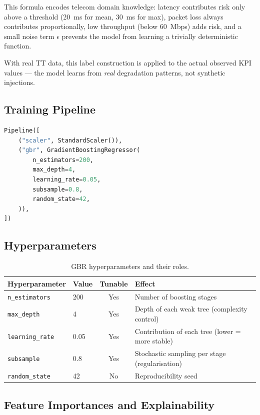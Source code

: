 This formula encodes telecom domain knowledge: latency contributes risk only above a threshold (20~ms for mean, 30~ms for max), packet loss always contributes proportionally, low throughput (below 60~Mbps) adds risk, and a small noise term $\epsilon$ prevents the model from learning a trivially deterministic function.

With real TT data, this label construction is applied to the actual observed KPI values --- the model learns from \emph{real} degradation patterns, not synthetic injections.

\subsection{Training Pipeline}

\begin{lstlisting}[language=Python, caption={SLA Risk model training pipeline.}]
Pipeline([
    ("scaler", StandardScaler()),
    ("gbr", GradientBoostingRegressor(
        n_estimators=200,
        max_depth=4,
        learning_rate=0.05,
        subsample=0.8,
        random_state=42,
    )),
])
\end{lstlisting}

\subsection{Hyperparameters}

\begin{table}[H]
\centering
\caption{GBR hyperparameters and their roles.}
\label{tab:gbr-hyperparams}
\begin{tabularx}{\textwidth}{@{}llcX@{}}
\toprule
\textbf{Hyperparameter} & \textbf{Value} & \textbf{Tunable} & \textbf{Effect} \\
\midrule
\texttt{n\_estimators}  & 200  & Yes & Number of boosting stages \\
\texttt{max\_depth}     & 4    & Yes & Depth of each weak tree (complexity control) \\
\texttt{learning\_rate} & 0.05 & Yes & Contribution of each tree (lower = more stable) \\
\texttt{subsample}      & 0.8  & Yes & Stochastic sampling per stage (regularisation) \\
\texttt{random\_state}  & 42   & No  & Reproducibility seed \\
\bottomrule
\end{tabularx}
\end{table}

\subsection{Feature Importances and Explainability}

